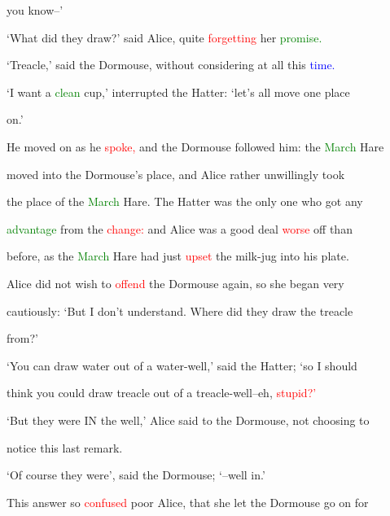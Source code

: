  you know--’



 ‘What did they draw?’ said Alice, quite \textcolor{red}{forgetting} her \textcolor{green}{promise.}



 ‘Treacle,’ said the Dormouse, without considering at all this \textcolor{blue}{time.}



 ‘I want a \textcolor{green}{clean} cup,’ \textcolor{BurntOrange}{interrupted} the Hatter: ‘let’s all move one place

 on.’



 He moved on as he \textcolor{red}{spoke,} and the Dormouse followed him: the \textcolor{green}{March} Hare

 moved into the Dormouse’s place, and Alice rather unwillingly took

 the place of the \textcolor{green}{March} Hare. The Hatter was the only one who got any

 \textcolor{green}{advantage} from the \textcolor{red}{change:} and Alice was a \textcolor{BurntOrange}{good} \textcolor{BurntOrange}{deal} \textcolor{red}{worse} off than

 before, as the \textcolor{green}{March} Hare had just \textcolor{red}{upset} the milk-jug into his plate.



 Alice did not wish to \textcolor{red}{offend} the Dormouse again, so she began very

 \textcolor{BurntOrange}{cautiously:} ‘But I don’t understand. Where did they draw the treacle

 from?’



 ‘You can draw water out of a water-well,’ said the Hatter; ‘so I should

 think you could draw treacle out of a treacle-well--eh, \textcolor{red}{stupid?’}



 ‘But they were IN the well,’ Alice said to the Dormouse, not choosing to

 notice this last remark.



 ‘Of course they were’, said the Dormouse; ‘--well in.’



 This answer so \textcolor{red}{confused} poor Alice, that she let the Dormouse go on for

